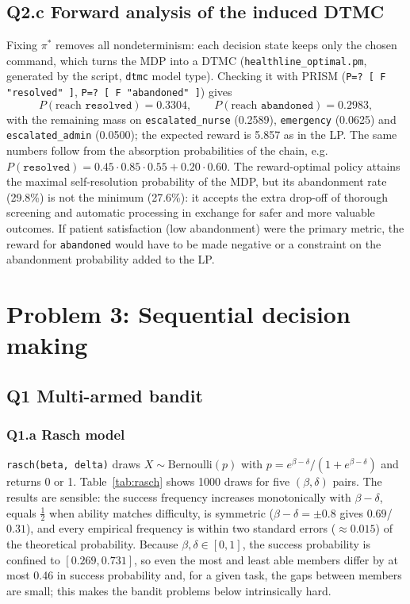 \documentclass[10pt,a4paper]{article}
\newcommand{\code}[1]{\texttt{#1}}
\begin{document}
\subsection{Q2.c Forward analysis of the induced DTMC}
Fixing $\pi^\ast$ removes all nondeterminism: each decision state keeps only the chosen command, which turns the MDP into a DTMC (\code{healthline\_optimal.pm}, generated by the script, \code{dtmc} model type). Checking it with PRISM (\code{P=? [ F "resolved" ]}, \code{P=? [ F "abandoned" ]}) gives
\begin{equation*}
P(\text{reach } \code{resolved}) = 0.3304,\qquad P(\text{reach } \code{abandoned}) = 0.2983,
\end{equation*}
with the remaining mass on \code{escalated\_nurse} (0.2589), \code{emergency} (0.0625) and \code{escalated\_admin} (0.0500); the expected reward is 5.857 as in the LP. The same numbers follow from the absorption probabilities of the chain, e.g.\ $P(\code{resolved})=0.45\cdot0.85\cdot0.55+0.20\cdot0.60$. The reward-optimal policy attains the maximal self-resolution probability of the MDP, but its abandonment rate (29.8\%) is not the minimum (27.6\%): it accepts the extra drop-off of thorough screening and automatic processing in exchange for safer and more valuable outcomes. If patient satisfaction (low abandonment) were the primary metric, the reward for \code{abandoned} would have to be made negative or a constraint on the abandonment probability added to the LP.

\clearpage
\section{Problem 3: Sequential decision making}

\subsection{Q1 Multi-armed bandit}
\subsubsection{Q1.a Rasch model} \code{rasch(beta, delta)} draws $X\sim\text{Bernoulli}(p)$ with $p=e^{\beta-\delta}/(1+e^{\beta-\delta})$ and returns 0 or 1. Table~\ref{tab:rasch} shows 1000 draws for five $(\beta,\delta)$ pairs. The results are sensible: the success frequency increases monotonically with $\beta-\delta$, equals $\tfrac12$ when ability matches difficulty, is symmetric ($\beta-\delta=\pm0.8$ gives $0.69$/$0.31$), and every empirical frequency is within two standard errors ($\approx0.015$) of the theoretical probability. Because $\beta,\delta\in[0,1]$, the success probability is confined to $[0.269, 0.731]$, so even the most and least able members differ by at most 0.46 in success probability and, for a given task, the gaps between members are small; this makes the bandit problems below intrinsically hard.
\end{document}
